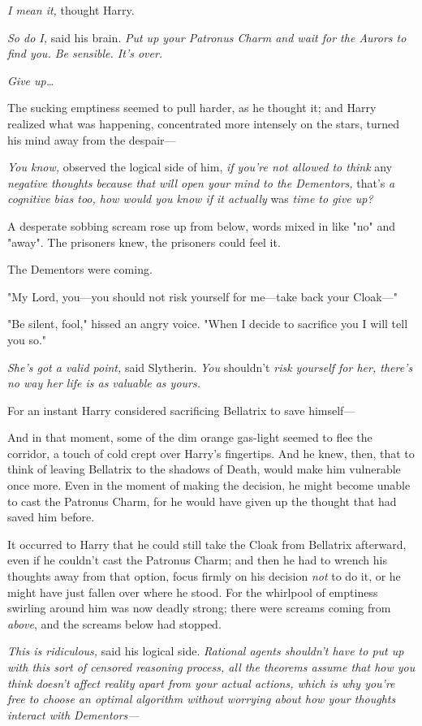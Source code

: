 \emph{I mean it,} thought Harry.

\emph{So do I,} said his brain. \emph{Put up your Patronus Charm and wait for 
the Aurors to find you. Be sensible. It's over.}

\emph{Give up{\ldots}}

The sucking emptiness seemed to pull harder, as he thought it; and Harry 
realized what was happening, concentrated more intensely on the stars, turned 
his mind away from the despair---

\emph{You know,} observed the logical side of him, \emph{if you're not allowed 
to think} any \emph{negative thoughts because that will open your mind to the 
Dementors,} that's \emph{a cognitive bias too, how would you know if it 
actually} was \emph{time to give up?}

A desperate sobbing scream rose up from below, words mixed in like "no" and 
"away". The prisoners knew, the prisoners could feel it.

The Dementors were coming.

"My Lord, you---you should not risk yourself for me---take back your Cloak---"

"Be silent, fool," hissed an angry voice. "When I decide to sacrifice you I 
will tell you so."

\emph{She's got a valid point,} said Slytherin. \emph{You} shouldn't \emph{risk 
yourself for her, there's no way her life is as valuable as yours.}

For an instant Harry considered sacrificing Bellatrix to save himself---

And in that moment, some of the dim orange gas-light seemed to flee the 
corridor, a touch of cold crept over Harry's fingertips. And he knew, then, 
that to think of leaving Bellatrix to the shadows of Death, would make him 
vulnerable once more. Even in the moment of making the decision, he might 
become unable to cast the Patronus Charm, for he would have given up the 
thought that had saved him before.

It occurred to Harry that he could still take the Cloak from Bellatrix 
afterward, even if he couldn't cast the Patronus Charm; and then he had to 
wrench his thoughts away from that option, focus firmly on his decision 
\emph{not} to do it, or he might have just fallen over where he stood. For the 
whirlpool of emptiness swirling around him was now deadly strong; there were 
screams coming from \emph{above}, and the screams below had stopped.

\emph{This is ridiculous,} said his logical side. \emph{Rational agents 
shouldn't have to put up with this sort of censored reasoning process, all the 
theorems assume that how you think doesn't affect reality apart from your 
actual actions, which is why you're free to choose an optimal algorithm without 
worrying about how your thoughts interact with Dementors---}

